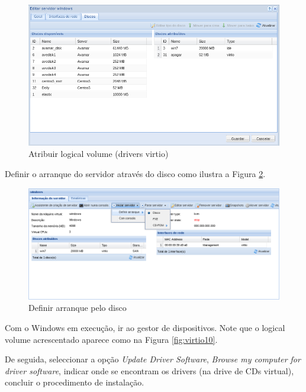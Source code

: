 \begin{figure}[H]
	\begin{center}
	\includegraphics[scale=0.5]{screenshots/virtio/virtio_7.png}
	\caption{Atribuir logical volume (drivers virtio)}
	\label{fig:virtio7}
	\end{center}
\end{figure}

Definir o arranque do servidor através do disco como ilustra a Figura \ref{fig:virtio5}.

\begin{figure}[H]
	\begin{center}
	\includegraphics[scale=0.5]{screenshots/virtio/virtio_5.png}
	\caption{Definir arranque pelo disco}
	\label{fig:virtio5}
	\end{center}
\end{figure}

Com o Windows em execução, ir ao gestor de dispositivos. Note que o logical volume acrescentado aparece como na Figura \ref{fig:virtio10}. 

De seguida, seleccionar a opção \textit{Update Driver Software}, \textit{Browse my computer for driver software}, indicar onde se encontram os drivers (na drive de CDs virtual), concluir o procedimento de instalação.

